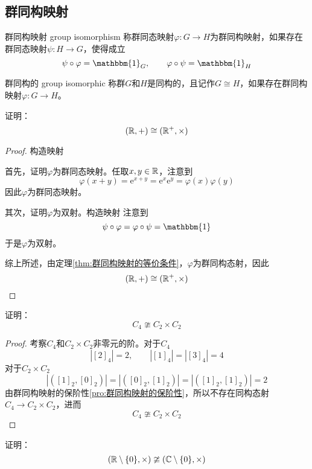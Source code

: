 \subsection{群同构映射}

\begin{definition}{群同构映射 group isomorphism}
	称群同态映射$\varphi:G\to H$为群同构映射，如果存在群同态映射$\psi:H\to G$，使得成立
	$$
	\psi\circ \varphi=\mathbbm{1}_{G},\qquad
	\varphi\circ \psi=\mathbbm{1}_{H}
	$$
\end{definition}

\begin{definition}{群同构的 group isomorphic}
	称群$G$和$H$是同构的，且记作$G\cong H$，如果存在群同构映射$\varphi:G\to H$。
\end{definition}

\begin{example}
	证明：
	\[ 
	(\mathbb{R},+)\cong (\mathbb{R}^+,\times)
	\]
\end{example}

\begin{proof}
	构造映射
	
	首先，证明$\varphi$为群同态映射。任取$x,y\in\mathbb{R}$，注意到
	$$
	\varphi(x+y)=\mathrm{e}^{x+y}=\mathrm{e}^x\mathrm{e}^y=\varphi(x)\varphi(y)
	$$
	因此$\varphi$为群同态映射。
	
	其次，证明$\varphi$为双射。构造映射
	注意到
	$$
	\psi\circ\varphi=\varphi\circ\psi=\mathbbm{1}
	$$
	于是$\varphi$为双射。
	
	综上所述，由定理\ref{thm:群同构映射的等价条件}，$\varphi$为群同构态射，因此
	\[ 
	(\mathbb{R},+)\cong (\mathbb{R}^+,\times)
	\]
\end{proof}

\begin{example}
	证明：\[ 
	C_4\ncong C_2\times C_2
	\]
\end{example}

\begin{proof}
	考察$C_4$和$C_2\times C_2$非零元的阶。对于$C_4$
	$$
	|[2]_4|=2,\qquad
	|[1]_4|=|[3]_4|=4
	$$
	对于$C_2\times C_2$
	$$
	|([1]_2,[0]_2)|=|([0]_2,[1]_2)|=|([1]_2,[1]_2)|=2
	$$
	由群同构映射的保阶性\ref{pro:群同构映射的保阶性}，所以不存在同构态射$C_4\to C_2\times C_2$，进而
	\[ 
	C_4\ncong C_2\times C_2
	 \]
\end{proof}

\begin{example}
	证明：
	\[ 
	(\mathbb{R}\setminus\{0\},\times)\ncong (\mathbb{C}\setminus\{0\},\times) 
	\]
\end{example}

